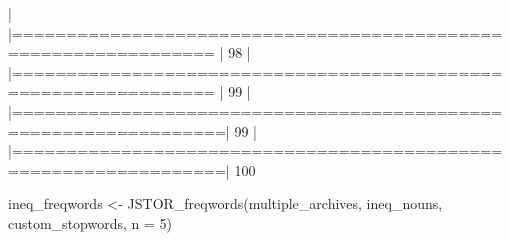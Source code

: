\documentclass[10pt]{article}
\newenvironment{CodeChunk}{}{}
\begin{document}
\begin{CodeChunk}
\begin{CodeChunk}
\begin{CodeOutput}
  |                                                                       
  |================================================================ |  98%
  |                                                                       
  |================================================================ |  99%
  |                                                                       
  |=================================================================|  99%
  |                                                                       
  |=================================================================| 100%
\end{CodeOutput}
\begin{CodeInput}
ineq_freqwords <- JSTOR_freqwords(multiple_archives, ineq_nouns, custom_stopwords, n = 5)
\end{CodeInput}
\begin{CodeOutput}


\end{CodeOutput}
\end{CodeChunk}
\end{CodeChunk}
\end{document}
